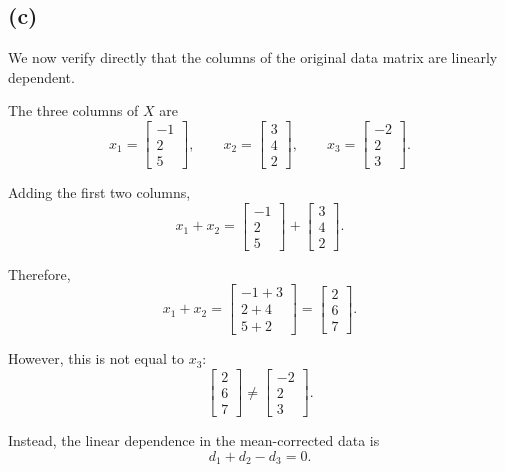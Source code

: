 \documentclass[12pt]{article}
\begin{document}
	\subsection*{(c)}
	
	We now verify directly that the columns of the original data
	matrix are linearly dependent.
	
	The three columns of \(X\) are
	\[
	x_1=
	\begin{bmatrix}
		-1\\2\\5
	\end{bmatrix},
	\qquad
	x_2=
	\begin{bmatrix}
		3\\4\\2
	\end{bmatrix},
	\qquad
	x_3=
	\begin{bmatrix}
		-2\\2\\3
	\end{bmatrix}.
	\]
	
	Adding the first two columns,
	\[
	x_1+x_2
	=
	\begin{bmatrix}
		-1\\2\\5
	\end{bmatrix}
	+
	\begin{bmatrix}
		3\\4\\2
	\end{bmatrix}.
	\]
	
	Therefore,
	\[
	x_1+x_2
	=
	\begin{bmatrix}
		-1+3\\
		2+4\\
		5+2
	\end{bmatrix}
	=
	\begin{bmatrix}
		2\\6\\7
	\end{bmatrix}.
	\]
	
	However, this is not equal to \(x_3\):
	\[
	\begin{bmatrix}
		2\\6\\7
	\end{bmatrix}
	\neq
	\begin{bmatrix}
		-2\\2\\3
	\end{bmatrix}.
	\]
	
	Instead, the linear dependence in the mean-corrected data is
	\[
	d_1+d_2-d_3=0.
	\]
	
\end{document}
